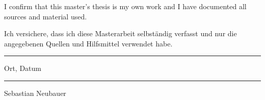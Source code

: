 \newpage
\vspace*{16cm}
\noindent
I confirm that this master's thesis is my own work and I have documented all sources and material used.

\vspace{1cm}
\noindent
Ich versichere, dass ich diese Masterarbeit selbständig verfasst und nur die angegebenen Quellen und Hilfsmittel verwendet habe.

\vspace*{2cm}
\parbox{5cm}{\centering \hrule
\strut \centering\footnotesize Ort, Datum} \hfill\parbox{5cm}{\hrule
\strut \centering\footnotesize Sebastian Neubauer}
